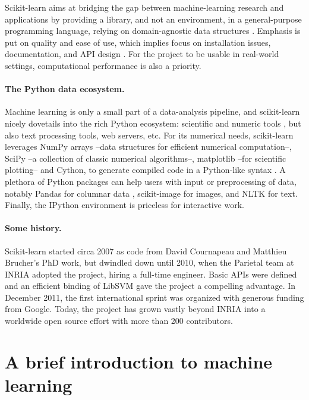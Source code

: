 \documentclass[a4paper]{article}
\begin{document}
Scikit-learn aims at bridging the gap between machine-learning research and
applications by providing a library, and not an environment, in a
general-purpose programming language, relying on domain-agnostic data structures
\cite{pedregosa2011}. Emphasis is put on quality and ease of use, which
implies focus on installation issues, documentation, and API design
\cite{buitinck2013ecml}. For the project to be usable in real-world
settings, computational performance is also a priority.

\paragraph{The Python data ecosystem.}
%
Machine learning is only a small part of a data-analysis pipeline, and
scikit-learn nicely dovetails into the rich Python ecosystem: scientific
and numeric tools \cite{oliphant2007python,varoquaux2013scipy}, but also
text processing tools, web servers, etc.
%
For its numerical needs, scikit-learn leverages NumPy arrays
\cite{vanderwalt2011} --data structures for efficient numerical
computation--, SciPy --a collection of classic numerical algorithms--,
matplotlib \cite{hunter2007matplotlib} --for scientific plotting-- and
Cython, to generate compiled code in a Python-like syntax
\cite{behnel2011cython}.
%
A plethora of Python packages can help users with input or preprocessing
of data, notably Pandas for columnar data \cite{mckinney2012}, scikit-image
for images, and NLTK for text. Finally, the IPython environment
\cite{perez2007ipython} is priceless for interactive work.

\paragraph{Some history.}
%
Scikit-learn started circa 2007 as code from David Cournapeau and
Matthieu Brucher's PhD work, but dwindled down until 2010, when the
Parietal team at INRIA adopted the project, hiring a full-time
engineer. Basic APIs were defined and an efficient binding of LibSVM
\cite{chang2011libsvm} gave the project a compelling advantage. In
December 2011, the first international sprint was organized with generous
funding from Google. Today, the project has grown vastly beyond
INRIA into a worldwide open source effort with more than 200 contributors.

\section{A brief introduction to machine learning}
\end{document}
